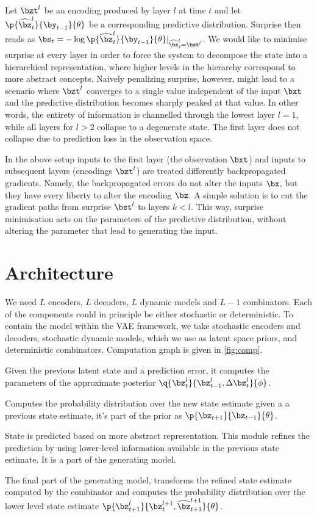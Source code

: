 \documentclass[]{article}
\begin{document}
	Let $\bzt^l$ be an encoding produced by  layer $l$ at time $t$ and let $\p{\widehat{\bz}_t^l}{\by_{t-1}}{\theta}$ be a corresponding predictive distribution. Surprise then reads as $\bs_t = -\log \p{\widehat{\bz}_t^l}{\by_{t-1}}{\theta}\lvert_{\widehat{\bz}_t^l = \bzt^l}$. We would like to minimise surprise at every layer in order to force the system to decompose the state into a hierarchical representation, where higher levels in the hierarchy correspond to more abstract concepts. Naively penalizing surprise, however, might lead to a scenario where $\bzt^l$ converges to a single value independent of the input $\bxt$ and the predictive distribution becomes sharply peaked at that value. In other words, the entirety of information is channelled through the lowest layer $l = 1$, while all layers for $l > 2$ collapse to a degenerate state. The first layer does not collapse due to prediction loss in the observation space.
	
	In the above setup inputs to the first layer (the observation $\bxt$) and inputs to subsequent layers (encodings $\bzt^l$) are treated differently \wrt backpropagated gradients. Namely, the backpropagated errors do not alter the inputs $\bx$, but they have every liberty to alter the encoding $\bz$. A simple solution is to cut the gradient paths from surprise $\bst^l$ to layers $k < l$. This way, surprise minimisation acts on the parameters of the predictive distribution, without altering the parameter that lead to generating the input.	
\section{Architecture}

	We need $L$ encoders, $L$ decoders, $L$ dynamic models and $L-1$ combinators. Each of the components could in principle be either stochastic or deterministic. To contain the model within the VAE framework, we take stochastic encoders and decoders, stochastic dynamic models, which we use as latent space priors, and deterministic combinators. Computation graph is given in \cref{fig:comp}.
	\begin{description}[leftmargin=\parindent]
		\item[encoder] Given the previous latent state and a prediction error, it computes the parameters of the approximate posterior $\q{\bz_t^l}{\bz_{t-1}^l, \Delta \bz_t^l}{\phi}$.
		\item[dynamic model] Computes the probability distribution over the new state estimate given a a previous state estimate, it's part of the prior as $\p{\bz_{t+1}}{\bz_{t-1}}{\theta}$.
		\item[combinator] State is predicted based on more abstract representation. This module refines the prediction by using lower-level information available in the previous state estimate. It is a part of the generating model.
		\item[decoder] The final part of the generating model, transforms the refined state estimate computed by the combinator and computes the probability distribution over the lower level state estimate $\p{\bz_{t+1}^l}{ \bz_{t}^{l+1}, \widehat{\bz}_{t+1}^{l+1} }{\theta}$.
	\end{description}
\end{document}
